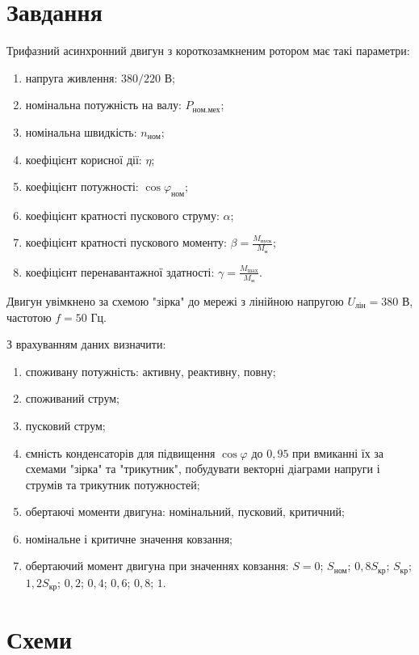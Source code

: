 \documentclass[a4paper]{article}
\begin{document}
    \section*{Завдання}
Трифазний асинхронний двигун з короткозамкненим ротором має такі параметри:
\begin{enumerate}
    \item напруга живлення: $380/220$ В;
    \item номінальна потужність на валу: $P_{\text{ном.мех}}$;
    \item номінальна швидкість: $n_{\text{ном}}$;
    \item коефіцієнт корисної дії: $\eta$;
    \item коефіцієнт потужності: $\cos \varphi_{\text{ном}}$;
    \item коефіцієнт кратності пускового струму: $\alpha$;
    \item коефіцієнт кратності пускового моменту: $\beta = \frac{M_{\text{пуск}}}{M_{\text{н}}}$;
    \item коефіцієнт перенавантажної здатності: $\gamma = \frac{M_{\text{max}}}{M_{\text{н}}}$.
\end{enumerate}

Двигун увімкнено за схемою "зірка" до мережі з лінійною напругою $U_{\text{лін}} = 380$ В, частотою $f = 50$ Гц.

З врахуванням даних визначити:
\begin{enumerate}
    \item споживану потужність: активну, реактивну, повну;
    \item споживаний струм;
    \item пусковий струм;
    \item ємність конденсаторів для підвищення $\cos\varphi$ до $0,95$ при вмиканні їх за схемами "зірка" та "трикутник", побудувати векторні діаграми напруги і струмів та трикутник потужностей;
    \item обертаючі моменти двигуна: номінальний, пусковий, критичний;
    \item номінальне і критичне значення ковзання;
    \item обертаючий момент двигуна при значеннях ковзання: $S = 0$; $S_{\text{ном}}$; $0,8S_{\text{кр}}$; $S_{\text{кр}}$; $1,2S_{\text{кр}}$; $0,2$; $0,4$; $0,6$; $0,8$; $1$.
\end{enumerate}
    
    \newpage 
    \section*{Схеми}
\end{document}
